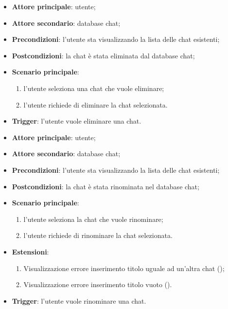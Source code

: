 \documentclass[10pt, a4paper]{article}
\begin{document}
    \begin{itemize}
        \item \textbf{Attore principale}: utente;
        \item \textbf{Attore secondario}: database chat;
        \item \textbf{Precondizioni}: l’utente sta visualizzando la lista delle chat esistenti;
        \item \textbf{Postcondizioni}: la chat è stata eliminata dal database chat;
        \item \textbf{Scenario principale}:
        \begin{enumerate}
            \item l’utente seleziona una chat che vuole eliminare;
            \item l’utente richiede di eliminare la chat selezionata.
        \end{enumerate}
        \item \textbf{Trigger}: l’utente vuole eliminare una chat.
    \end{itemize}

    \begin{itemize}
        \item \textbf{Attore principale}: utente;
        \item \textbf{Attore secondario}: database chat;
        \item \textbf{Precondizioni}: l’utente sta visualizzando la lista delle chat esistenti;
        \item \textbf{Postcondizioni}: la chat è stata rinominata nel database chat;
        \item \textbf{Scenario principale}:
        \begin{enumerate}
            \item l’utente seleziona la chat che vuole rinominare;
            \item l’utente richiede di rinominare la chat selezionata.
        \end{enumerate}
        \item \textbf{Estensioni}:
         \begin{enumerate}
            \item Visualizzazione errore inserimento titolo uguale ad un’altra chat ();
            \item Visualizzazione errore inserimento titolo vuoto ().
        \end{enumerate}
        \item \textbf{Trigger}: l’utente vuole rinominare una chat.
    \end{itemize}
\end{document}
